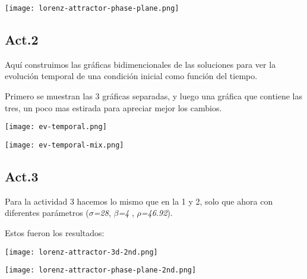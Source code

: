 \documentclass{article}
\begin{document}
\begin{center}
	\texttt{[image: lorenz-attractor-phase-plane.png]}
    
\end{center}
\vspace{0.3cm}



\subsection*{Act.2}

Aquí construimos las gráficas bidimencionales de las soluciones para ver la evolución temporal de una condición inicial como función del tiempo.

Primero se muestran las 3 gráficas separadas, y luego una gráfica que contiene las tres, un poco mas estirada para apreciar mejor los cambios.


\begin{center}
	\texttt{[image: ev-temporal.png]}
    
\end{center}
\vspace{0.3cm}

\begin{center}
	\texttt{[image: ev-temporal-mix.png]}
    
\end{center}
\vspace{0.3cm}



\subsection*{Act.3}

Para la actividad 3 hacemos lo mismo que en la 1 y 2, solo que ahora con diferentes parámetros ($\sigma$\textit{=28}, $\beta$\textit{=4} , $\rho$\textit{=46.92}).

Estos fueron los resultados:

\begin{center}
	\texttt{[image: lorenz-attractor-3d-2nd.png]}
    
\end{center}
\vspace{0.3cm}

\begin{center}
	\texttt{[image: lorenz-attractor-phase-plane-2nd.png]}
    
\end{center}
\vspace{0.3cm}
\end{document}
